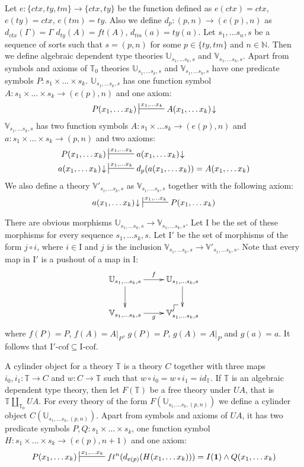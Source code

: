 \documentclass[reqno]{amsart}
\makeatletter
\theoremstyle{definition}
\theoremstyle{remark}
\newcommand{\emptyCtx}{\mathbf{1}}
\newcommand{\I}{\mathrm{I}}
\newcommand{\class}[2]{#1\text{-}\mathrm{#2}}
\newcommand{\Icof}[1][\I]{\class{#1}{cof}}
\numberwithin{figure}{section}
\newcommand{\po}[1][dr]{\save*!/#1+1.2pc/#1:(1,-1)@^{|-}\restore}
\makeatother
\begin{document}
Let $e : \{ ctx, ty, tm \} \to \{ ctx, ty \}$ be the function defined as $e(ctx) = ctx$, $e(ty) = ctx$, $e(tm) = ty$.
Also we define $d_p : (p,n) \to (e(p),n)$ as $d_{ctx}(\Gamma) = \Gamma$ $d_{ty}(A) = ft(A)$, $d_{tm}(a) = ty(a)$.
Let $s_1, \ldots s_n, s$ be a sequence of sorts such that $s = (p,n)$ for some $p \in \{ ty, tm \}$ and $n \in \mathbb{N}$.
Then we define algebraic dependent type theories $\mathbb{U}_{s_1, \ldots s_k, s}$ and $\mathbb{V}_{s_1, \ldots s_k, s}$.
Apart from symbols and axioms of $\mathbb{T}_0$ theories $\mathbb{U}_{s_1, \ldots s_k, s}$
and $\mathbb{V}_{s_1, \ldots s_k, s}$ have one predicate symbols $P : s_1 \times \ldots \times s_k$.
$\mathbb{U}_{s_1, \ldots s_k, s}$ has one function symbol $A : s_1 \times \ldots \times s_k \to (e(p),n)$ and one axiom:
\[ P(x_1, \ldots x_k) \sststile{}{x_1, \ldots x_k} A(x_1, \ldots x_k)\!\downarrow \]
$\mathbb{V}_{s_1, \ldots s_k, s}$ has two function symbols $A : s_1 \times \ldots s_k \to (e(p),n)$ and $a : s_1 \times \ldots \times s_k \to (p,n)$ and two axioms:
\begin{align*}
P(x_1, \ldots x_k) & \sststile{}{x_1, \ldots x_k} a(x_1, \ldots x_k)\!\downarrow \\
a(x_1, \ldots x_k)\!\downarrow & \sststile{}{x_1, \ldots x_k} d_p(a(x_1, \ldots x_k)) = A(x_1, \ldots x_k)
\end{align*}
We also define a theory $\mathbb{V}'_{s_1, \ldots s_k, s}$ as $\mathbb{V}_{s_1, \ldots s_k, s}$ together with the following axiom:
\[ a(x_1, \ldots x_k)\!\downarrow\ \sststile{}{x_1, \ldots x_k} P(x_1, \ldots x_k) \]

There are obvious morphisms $\mathbb{U}_{s_1, \ldots s_k, s} \to \mathbb{V}_{s_1, \ldots s_k, s}$.
Let $\I$ be the set of these morphisms for every sequence $s_1, \ldots s_k, s$.
Let $\I'$ be the set of morphisms of the form $j \circ i$, where $i \in \I$ and $j$ is the inclusion $\mathbb{V}_{s_1, \ldots s_k, s} \to \mathbb{V}'_{s_1, \ldots s_k, s}$.
Note that every map in $\I'$ is a pushout of a map in $\I$:
\[ \xymatrix{ \mathbb{U}_{s_1, \ldots s_k, s} \ar[r]^f \ar[d] & \mathbb{U}_{s_1, \ldots s_k, s} \ar[d] \\
              \mathbb{V}_{s_1, \ldots s_k, s} \ar[r]_g & \po \mathbb{V}'_{s_1, \ldots s_k, s}
            } \]
where $f(P) = P$, $f(A) = A|_P$, $g(P) = P$, $g(A) = A|_P$ and $g(a) = a$.
It follows that $\Icof[\I'] \subseteq \Icof$.

A cylinder object for a theory $\mathbb{T}$ is a theory $C$ together with three maps $i_0,i_1 : \mathbb{T} \to C$ and $w : C \to \mathbb{T}$
such that $w \circ i_0 = w \circ i_1 = id_{\mathbb{T}}$.
If $\mathbb{T}$ is an algebraic dependent type theory, then let $F(\mathbb{T})$ be a free theory under $UA$, that is $\mathbb{T} \amalg_{\mathbb{T}_0} UA$.
For every theory of the form $F(\mathbb{U}_{s_1, \ldots s_k, (p,n)})$ we define a cylinder object $C(\mathbb{U}_{s_1, \ldots s_k, (p,n)})$.
Apart from symbols and axioms of $UA$, it has two predicate symbols $P,Q : s_1 \times \ldots \times s_k$,
one function symbol $H : s_1 \times \ldots \times s_k \to (e(p),n+1)$ and one axiom:
\[ P(x_1, \ldots x_k) \sststile{}{x_1, \ldots x_k} ft^n(d_{e(p)}(H(x_1, \ldots x_k))) = I(\emptyCtx) \land Q(x_1, \ldots x_k) \]
\end{document}
